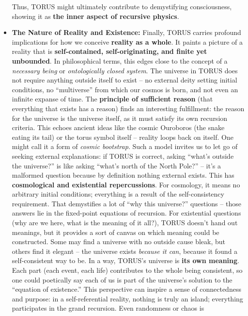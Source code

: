 \documentclass[
]{article}
\begin{document}
\begin{itemize}
  Thus, TORUS might ultimately contribute to demystifying consciousness,
  showing it as \textbf{the inner aspect of recursive physics}.
\item
  \textbf{The Nature of Reality and Existence:} Finally, TORUS carries
  profound implications for how we conceive \textbf{reality as a whole}.
  It paints a picture of a reality that is \textbf{self-contained,
  self-originating, and finite yet unbounded}. In philosophical terms,
  this edges close to the concept of a \emph{necessary being} or
  \emph{ontologically closed system}. The universe in TORUS does not
  require anything outside itself to exist -- no external deity setting
  initial conditions, no ``multiverse'' from which our cosmos is born,
  and not even an infinite expanse of time. The \textbf{principle of
  sufficient reason} (that everything that exists has a reason) finds an
  interesting fulfillment: the reason for the universe is the universe
  itself, as it must satisfy its own recursion criteria. This echoes
  ancient ideas like the cosmic Ouroboros (the snake eating its tail) or
  the torus symbol itself -- reality loops back on itself. One might
  call it a form of \emph{cosmic bootstrap}. Such a model invites us to
  let go of seeking external explanations: if TORUS is correct, asking
  ``what's outside the universe?'' is like asking ``what's north of the
  North Pole?'' -- it's a malformed question because by definition
  nothing external exists. This has \textbf{cosmological and existential
  repercussions}. For cosmology, it means no arbitrary initial
  conditions; everything is a result of the self-consistency
  requirement. That demystifies a lot of ``why this universe?''
  questions -- those answers lie in the fixed-point equations of
  recursion. For existential questions (why are we here, what is the
  meaning of it all?), TORUS doesn't hand out meanings, but it provides
  a sort of canvas on which meaning could be constructed. Some may find
  a universe with no outside cause bleak, but others find it elegant --
  the universe exists \emph{because it can}, because it found a
  self-consistent way to be. In a way, TORUS's universe is \textbf{its
  own meaning}. Each part (each event, each life) contributes to the
  whole being consistent, so one could poetically say each of us is part
  of the universe's solution to the ``equation of existence.'' This
  perspective can inspire a sense of connectedness and purpose: in a
  self-referential reality, nothing is truly an island; everything
  participates in the grand recursion. Even randomness or chaos is

\end{itemize}
\end{document}
